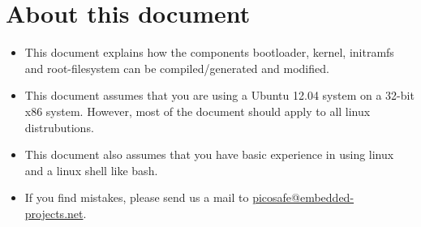 \section{About this document}

\begin{itemize}
\item This document explains how the components bootloader, kernel, initramfs and root-filesystem can be compiled/generated and modified.
\item This document assumes that you are using a Ubuntu 12.04 system on a 32-bit x86 system. However, most of the document should apply to all linux distrubutions.
\item This document also assumes that you have basic experience in using linux and a linux shell like bash.
\item If you find mistakes, please send us a mail to \href{mailto:picosafe@embedded-projects.net}{picosafe@embedded-projects.net}.
\end{itemize}

